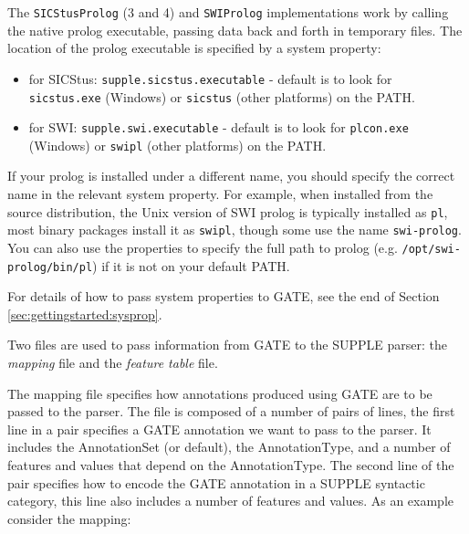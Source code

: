 
The \texttt{SICStusProlog} (3 and 4) and \texttt{SWIProlog} implementations
work by calling the native prolog executable, passing data back and forth in
temporary files.  The location of the prolog executable is specified by a
system property:
%
\begin{itemize}
\item for SICStus: \texttt{supple.sicstus.executable} - default is to look for
\texttt{sicstus.exe} (Windows) or \texttt{sicstus} (other platforms) on the
PATH.
\item for SWI: \texttt{supple.swi.executable} - default is to look for
\texttt{plcon.exe} (Windows) or \texttt{swipl} (other platforms) on the PATH.
\end{itemize}

If your prolog is installed under a different name, you should specify the
correct name in the relevant system property.  For example, when installed from
the source distribution, the Unix version of SWI prolog is typically installed
as \texttt{pl}, most binary packages install it as \texttt{swipl}, though some
use the name \texttt{swi-prolog}.  You can also use the properties to specify
the full path to prolog (e.g. \texttt{/opt/swi-prolog/bin/pl}) if it is not on
your default PATH.

For details of how to pass system properties to GATE, see
the end of Section \ref{sec:gettingstarted:sysprop}.


Two files are used to pass information from GATE to the SUPPLE
parser: the {\em mapping} file and the {\em feature table} file.\\


The mapping file specifies how annotations produced using GATE are to be passed
to the parser. The file is composed of a number of pairs of lines, the first
line in a pair specifies a GATE annotation we want to pass to the parser. It
includes the AnnotationSet (or default), the AnnotationType, and a number of
features and values that depend on the AnnotationType. The second line of the
pair specifies how to encode the GATE annotation in a SUPPLE syntactic
category, this line also includes a number of features and values. As an example
consider the mapping:

